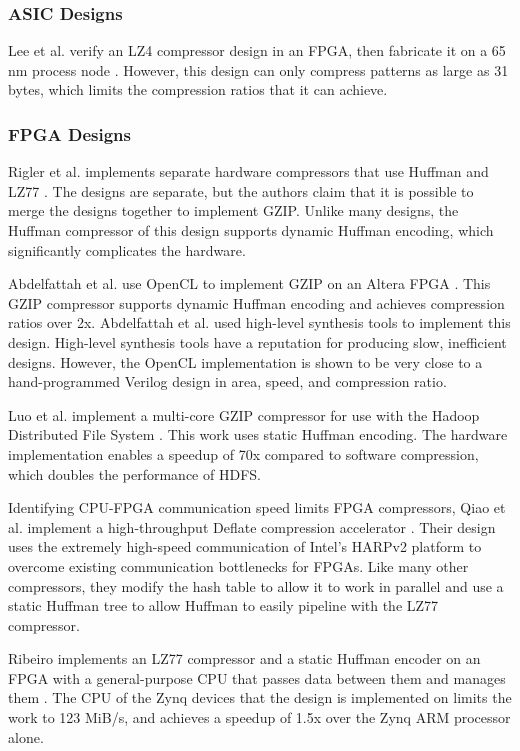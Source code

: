 \documentclass[doublespace,nopageskip]{VTthesis}
\begin{document}
\subsubsection{ASIC Designs}\label{sss:asic_compressor_designs}
Lee et al. verify an LZ4 compressor design in an FPGA, then fabricate it on a 65 nm process node \cite{hardwarelz4}. However, this design can only compress patterns as large as 31 bytes, which limits the compression ratios that it can achieve.

\subsubsection{FPGA Designs}\label{sss:fpga_compressor_designs}
Rigler et al. implements separate hardware compressors that use Huffman and LZ77 \cite{fpgahuffmanlz77}. The designs are separate, but the authors claim that it is possible to merge the designs together to implement GZIP. Unlike many designs, the Huffman compressor of this design supports dynamic Huffman encoding, which significantly complicates the hardware.

Abdelfattah et al. use OpenCL to implement GZIP on an Altera FPGA \cite{gziponachip}. This GZIP compressor supports dynamic Huffman encoding and achieves compression ratios over 2x. Abdelfattah et al. used high-level synthesis tools to implement this design. High-level synthesis tools have a reputation for producing slow, inefficient designs. However, the OpenCL implementation is shown to be very close to a hand-programmed Verilog design in area, speed, and compression ratio.

Luo et al. implement a multi-core GZIP compressor for use with the Hadoop Distributed File System \cite{hdfsgzip}. This work uses static Huffman encoding. The hardware implementation enables a speedup of 70x compared to software compression, which doubles the performance of HDFS.

Identifying CPU-FPGA communication speed limits FPGA compressors, Qiao et al. implement a high-throughput Deflate compression accelerator \cite{fpgadeflate}. Their design uses the extremely high-speed communication of Intel's HARPv2 platform to overcome existing communication bottlenecks for FPGAs. Like many other compressors, they modify the hash table to allow it to work in parallel and use a static Huffman tree to allow Huffman to easily pipeline with the LZ77 compressor.

Ribeiro implements an LZ77 compressor and a static Huffman encoder on an FPGA with a general-purpose CPU that passes data between them and manages them \cite{ribeiro}. The CPU of the Zynq devices that the design is implemented on limits the work to 123 MiB/s, and achieves a speedup of 1.5x over the Zynq ARM processor alone.
\end{document}
